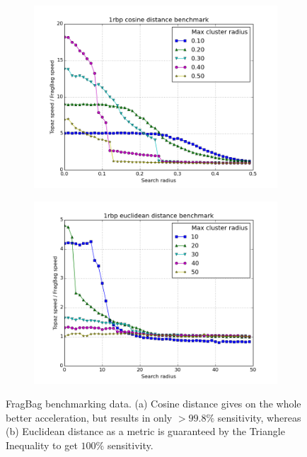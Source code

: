 \documentclass[review,preprint,12pt]{elsarticle}
\theoremstyle{definition}
\theoremstyle{remark}
\numberwithin{equation}{section}
\begin{document}
\begin{figure}[tbp]
\begin{subfigure}[b]{0.40\textwidth}
        \includegraphics[width=1\textwidth]{assets/1rbp_cosine.png}
    \end{subfigure}%
    \begin{subfigure}[b]{0.40\textwidth}
        \includegraphics[width=1\textwidth]{assets/1rbp_euclid.png}
    \end{subfigure}
    \caption{FragBag benchmarking data. (a) Cosine distance gives on the whole better acceleration, but results in only $>99.8\%$ sensitivity, whereas (b) Euclidean distance as a metric is guaranteed by the Triangle Inequality to get $100\%$ sensitivity.}
    \label{fig:fragbag}
\end{figure}
\end{document}
